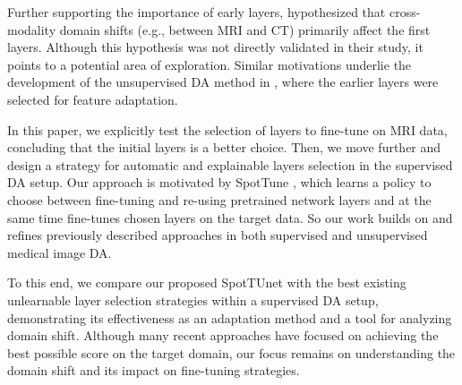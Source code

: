 Further supporting the importance of early layers, \cite{dou2018unsupervised} hypothesized that cross-modality domain shifts (e.g., between MRI and CT) primarily affect the first layers. Although this hypothesis was not directly validated in their study, it points to a potential area of exploration. Similar motivations underlie the development of the unsupervised DA method in \cite{zhao2021robust}, where the earlier layers were selected for feature adaptation.

In this paper, we explicitly test the selection of layers to fine-tune on MRI data, concluding that the initial layers is a better choice. Then, we move further and design a strategy for automatic and explainable layers selection in the supervised DA setup. Our approach is motivated by SpotTune \cite{guo2019spottune}, which learns a policy to choose between fine-tuning and re-using pretrained network layers and at the same time fine-tunes chosen layers on the target data. So our work builds on and refines previously described approaches in both supervised and unsupervised medical image DA.

To this end, we compare our proposed SpotTUnet with the best existing unlearnable layer selection strategies within a supervised DA setup, demonstrating its effectiveness as an adaptation method and a tool for analyzing domain shift. Although many recent approaches have focused on achieving the best possible score on the target domain, our focus remains on understanding the domain shift and its impact on fine-tuning strategies.



